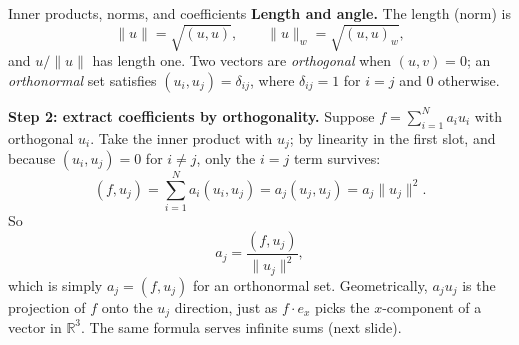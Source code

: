 \documentclass[11pt]{beamer}
\begin{document}
\begin{frame}[allowframebreaks=1.00]{Inner products, norms, and coefficients}
\textbf{Length and angle.} The length (norm) is
\begin{equation}
  \|u\|=\sqrt{(u,u)},
  \qquad
  \|u\|_w=\sqrt{(u,u)_w},
  \label{eq:induced-norm}
\end{equation}
and $u/\|u\|$ has length one.  Two vectors are \emph{orthogonal} when $(u,v)=0$;
an \emph{orthonormal} set satisfies $(u_i,u_j)=\delta_{ij}$, where $\delta_{ij}=1$ for $i=j$ and $0$ otherwise.

\par\framebreak\par
\textbf{Step 2: extract coefficients by orthogonality.}  Suppose
$f=\sum_{i=1}^{N}a_iu_i$ with orthogonal $u_i$.  Take the inner product with $u_j$;
by linearity in the first slot, and because $(u_i,u_j)=0$ for $i\ne j$, only the
$i=j$ term survives:
\[
  (f,u_j)=\sum_{i=1}^{N}a_i(u_i,u_j)=a_j(u_j,u_j)=a_j\|u_j\|^2.
\]
So
\begin{equation}
  a_j=\frac{(f,u_j)}{\|u_j\|^2},
  \label{eq:coeff-orthogonal}
\end{equation}
which is simply $a_j=(f,u_j)$ for an orthonormal set.  Geometrically, $a_ju_j$ is the
projection of $f$ onto the $u_j$ direction, just as $f\cdot e_x$ picks the
$x$-component of a vector in $\mathbb R^3$.  The same formula serves infinite
sums (next slide).
\end{frame}
\end{document}
